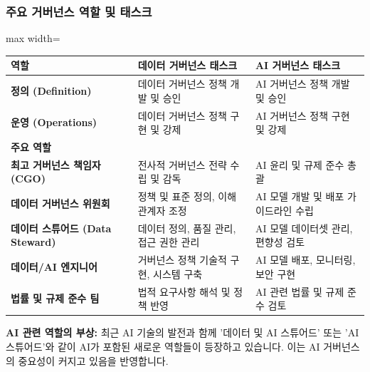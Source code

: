 \documentclass[11pt,a4paper]{article}
\theoremstyle{definition}
\begin{document}
\subsubsection*{주요 거버넌스 역할 및 태스크}
\begin{adjustbox}{max width=\textwidth}
\begin{tabular}{p{}p{}p{}}
\toprule
\textbf{역할} & \textbf{데이터 거버넌스 태스크} & \textbf{AI 거버넌스 태스크} \\
\midrule
\textbf{정의 (Definition)} & 데이터 거버넌스 정책 개발 및 승인 & AI 거버넌스 정책 개발 및 승인 \\
\textbf{운영 (Operations)} & 데이터 거버넌스 정책 구현 및 강제 & AI 거버넌스 정책 구현 및 강제 \\
\midrule
\textbf{주요 역할} & & \\
\textbf{최고 거버넌스 책임자 (CGO)} & 전사적 거버넌스 전략 수립 및 감독 & AI 윤리 및 규제 준수 총괄 \\
\textbf{데이터 거버넌스 위원회} & 정책 및 표준 정의, 이해관계자 조정 & AI 모델 개발 및 배포 가이드라인 수립 \\
\textbf{데이터 스튜어드 (Data Steward)} & 데이터 정의, 품질 관리, 접근 권한 관리 & AI 모델 데이터셋 관리, 편향성 검토 \\
\textbf{데이터/AI 엔지니어} & 거버넌스 정책 기술적 구현, 시스템 구축 & AI 모델 배포, 모니터링, 보안 구현 \\
\textbf{법률 및 규제 준수 팀} & 법적 요구사항 해석 및 정책 반영 & AI 관련 법률 및 규제 준수 검토 \\
\bottomrule
\end{tabular}
\end{adjustbox}
\label{tab:gov_roles}

\begin{tcolorbox}[cautionbox]
\textbf{AI 관련 역할의 부상:}
최근 AI 기술의 발전과 함께 '데이터 및 AI 스튜어드' 또는 'AI 스튜어드'와 같이 AI가 포함된 새로운 역할들이 등장하고 있습니다. 이는 AI 거버넌스의 중요성이 커지고 있음을 반영합니다.
\end{tcolorbox}
\end{document}
